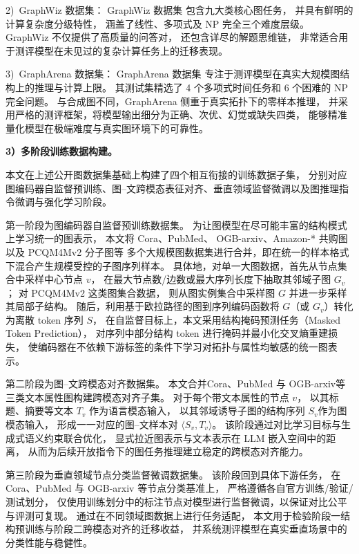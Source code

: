 {2)\ GraphWiz 数据集}：
GraphWiz 数据集 \cite{Chen2024GraphWizAI} 
包含九大类核心图任务，
并具有鲜明的计算复杂度分级特性，
涵盖了线性、多项式及 NP 完全三个难度层级。
GraphWiz 不仅提供了高质量的问答对，
还包含详尽的解题思维链，
非常适合用于测评模型在未见过的复杂计算任务上的迁移表现。


{3)\ GraphArena 数据集}：
GraphArena 数据集 \cite{Tang2024GraphArenaBL} 专注于测评模型在真实大规模图结构上的推理与计算上限。
其测试集精选了 4 个多项式时间任务和 6 个困难的 NP 完全问题。
与合成图不同，GraphArena 侧重于真实拓扑下的零样本推理，
并采用严格的测评框架，将模型输出细分为正确、次优、幻觉或缺失四类，
能够精准量化模型在极端难度与真实图环境下的可靠性。



\textbf{3）多阶段训练数据构建。}

本文在上述公开图数据集基础上构建了四个相互衔接的训练数据子集，
分别对应图编码器自监督预训练、图–文跨模态表征对齐、垂直领域监督微调以及图推理指令微调与强化学习阶段。


第一阶段为图编码器自监督预训练数据集。
为让图模型在尽可能丰富的结构模式上学习统一的图表示，
本文将 Cora\cite{Hu2020OpenGB}、PubMed\cite{Sen2008CollectiveCI}、
OGB-arxiv\cite{Hu2020OpenGB}、Amazon-* \cite{Wan2018ItemRO} 共购图
以及 PCQM4Mv2 \cite{Hu2021OGBLSCAL}分子图等
多个大规模图数据集进行合并，即在统一的样本格式下混合产生规模受控的子图序列样本。
具体地，对单一大图数据，首先从节点集合中采样中心节点 $v$，
在最大节点数/边数或最大序列长度下抽取其邻域子图 $G_v$；
对 PCQM4Mv2 \cite{Hu2021OGBLSCAL}这类图集合数据，
则从图实例集合中采样图 $G$ 并进一步采样其局部子结构。
随后，利用基于欧拉路径的图到序列编码函数将 $G$（或 $G_v$）转化为离散 token 序列 $S$，
在自监督目标上，本文采用结构掩码预测任务（Masked Token Prediction），
对序列中部分结构 token 进行掩码并最小化交叉熵重建损失，
使编码器在不依赖下游标签的条件下学习对拓扑与属性均敏感的统一图表示。

第二阶段为图–文跨模态对齐数据集。
本文合并Cora\cite{Hu2020OpenGB}、PubMed\cite{Sen2008CollectiveCI} 与 OGB-arxiv\cite{Hu2020OpenGB}等三类文本属性图构建跨模态对齐子集。
对于每个带文本属性的节点 $v$，
以其标题、摘要等文本 $T_v$ 作为语言模态输入，
以其邻域诱导子图的结构序列 $S_v$作为图模态输入，
形成一一对应的图--文样本对 $\langle S_v, T_v\rangle$。
该阶段通过对比学习目标与生成式语义约束联合优化，
显式拉近图表示与文本表示在 LLM 嵌入空间中的距离，
从而为后续开放指令下的图任务推理建立稳定的跨模态对齐能力。

第三阶段为垂直领域节点分类监督微调数据集。
该阶段回到具体下游任务，
在 Cora\cite{Hu2020OpenGB}、PubMed\cite{Sen2008CollectiveCI} 与 OGB-arxiv\cite{Hu2020OpenGB} 等节点分类基准上，
严格遵循各自官方训练/验证/测试划分，
仅使用训练划分中的标注节点对模型进行监督微调，以保证对比公平与评测可复现。
通过在不同领域图数据上进行任务适配，
本文用于检验阶段一结构预训练与阶段二跨模态对齐的迁移收益，
并系统测评模型在真实垂直场景中的分类性能与稳健性。


